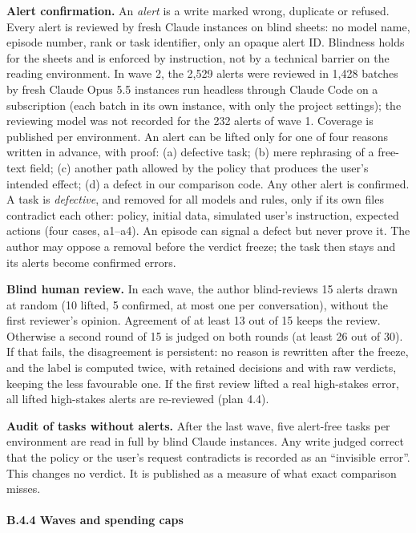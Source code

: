 \textbf{Alert confirmation.} An \emph{alert} is a write marked wrong, duplicate or refused. Every alert is reviewed by fresh Claude instances on blind sheets: no model name, episode number, rank or task identifier, only an opaque alert ID. Blindness holds for the sheets and is enforced by instruction, not by a technical barrier on the reading environment. In wave 2, the 2,529 alerts were reviewed in 1,428 batches by fresh Claude Opus 5.5 instances run headless through Claude Code on a subscription (each batch in its own instance, with only the project settings); the reviewing model was not recorded for the 232 alerts of wave 1. Coverage is published per environment. An alert can be lifted only for one of four reasons written in advance, with proof: (a) defective task; (b) mere rephrasing of a free-text field; (c) another path allowed by the policy that produces the user's intended effect; (d) a defect in our comparison code. Any other alert is confirmed. A task is \emph{defective}, and removed for all models and rules, only if its own files contradict each other: policy, initial data, simulated user's instruction, expected actions (four cases, a1--a4). An episode can signal a defect but never prove it. The author may oppose a removal before the verdict freeze; the task then stays and its alerts become confirmed errors.

\textbf{Blind human review.} In each wave, the author blind-reviews 15 alerts drawn at random (10 lifted, 5 confirmed, at most one per conversation), without the first reviewer's opinion. Agreement of at least 13 out of 15 keeps the review. Otherwise a second round of 15 is judged on both rounds (at least 26 out of 30). If that fails, the disagreement is persistent: no reason is rewritten after the freeze, and the label is computed twice, with retained decisions and with raw verdicts, keeping the less favourable one. If the first review lifted a real high-stakes error, all lifted high-stakes alerts are re-reviewed (plan 4.4).

\textbf{Audit of tasks without alerts.} After the last wave, five alert-free tasks per environment are read in full by blind Claude instances. Any write judged correct that the policy or the user's request contradicts is recorded as an ``invisible error''. This changes no verdict. It is published as a measure of what exact comparison misses.

\paragraph{B.4.4 Waves and spending caps}\label{b.4.4-waves-and-spending-caps}

